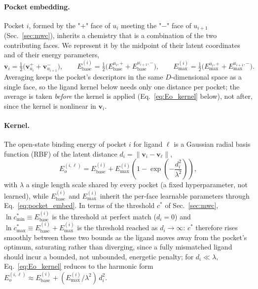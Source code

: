 \documentclass[aps,pre,superscriptaddress,floatfix,longbibliography]{revtex4-2}
\begin{document}
\paragraph{Pocket embedding.} Pocket $i$, formed by the "$+$" face of $u_i$
meeting the "$-$" face of $u_{i+1}$ (Sec.~\ref{sec:mwc}), inherits a
chemistry that is a combination of the two contributing faces. We represent
it by the midpoint of their latent coordinates and of their energy
parameters,
\begin{equation}
\mathbf v_i = \tfrac{1}{2}\bigl(\mathbf v_{u_i}^{+} + \mathbf v_{u_{i+1}}^{-}\bigr),
\qquad
E_\text{base}^{(i)} = \tfrac{1}{2}\bigl(E_\text{base}^{u_i,+} + E_\text{base}^{u_{i+1},-}\bigr),
\qquad
E_\text{max}^{(i)} = \tfrac{1}{2}\bigl(E_\text{max}^{u_i,+} + E_\text{max}^{u_{i+1},-}\bigr).
\label{eq:pocket_embed}
\end{equation}
Averaging keeps the pocket's descriptors in the same $D$-dimensional space as
a single face, so the ligand kernel below needs only one distance per
pocket; the average is taken \emph{before} the kernel is applied (Eq.~\eqref{eq:Eo_kernel} below), not after, since the kernel is nonlinear in
$\mathbf v_i$.

\paragraph{Kernel.} The open-state binding energy of pocket $i$ for ligand
$\ell$ is a Gaussian radial basis function (RBF) of the latent distance
$d_i = \|\mathbf v_i - \mathbf v_\ell\|$,
\begin{equation}
E_o^{(i,\ell)} = E_\text{base}^{(i)} + E_\text{max}^{(i)}\left(1-\exp\!\left(-\frac{d_i^2}{\lambda^2}\right)\right),
\label{eq:Eo_kernel}
\end{equation}
with $\lambda$ a single length scale shared by every pocket (a fixed
hyperparameter, not learned), while $E_\text{base}^{(i)}$ and
$E_\text{max}^{(i)}$ inherit the per-face learnable parameters through
Eq.~\eqref{eq:pocket_embed}. In terms of the threshold $c^*$ of
Sec.~\ref{sec:mwc}, $\ln c^*_\text{min}\equiv E_\text{base}^{(i)}$ is the
threshold at perfect match ($d_i=0$) and $\ln c^*_\text{max}\equiv
E_\text{base}^{(i)}+E_\text{max}^{(i)}$ is the threshold reached as
$d_i\to\infty$: $c^*$ therefore rises smoothly between these two bounds as
the ligand moves away from the pocket's optimum, saturating rather than
diverging, since a fully mismatched ligand should incur a bounded, not
unbounded, energetic penalty; for $d_i\ll\lambda$, Eq.~\eqref{eq:Eo_kernel}
reduces to the harmonic form $E_o^{(i,\ell)}\approx E_\text{base}^{(i)} +
(E_\text{max}^{(i)}/\lambda^2)\,d_i^2$.
\end{document}
